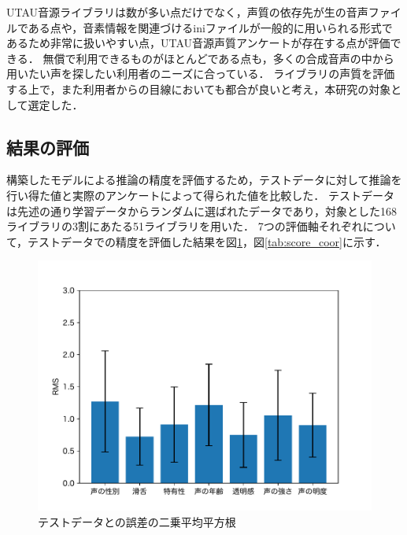 \documentclass[a4j,8pt,twocolumn]{extarticle}
\begin{document}
UTAU音源ライブラリは数が多い点だけでなく，声質の依存先が生の音声ファイルである点や，音素情報を関連づけるiniファイルが一般的に用いられる形式であるため非常に扱いやすい点，UTAU音源声質アンケートが存在する点が評価できる．
無償で利用できるものがほとんどである点も，多くの合成音声の中から用いたい声を探したい利用者のニーズに合っている．
ライブラリの声質を評価する上で，また利用者からの目線においても都合が良いと考え，本研究の対象として選定した．

\subsection{結果の評価} \label{sec:eval}
構築したモデルによる推論の精度を評価するため，テストデータに対して推論を行い得た値と実際のアンケートによって得られた値を比較した．
テストデータは先述の通り学習データからランダムに選ばれたデータであり，対象とした168ライブラリの3割にあたる51ライブラリを用いた．
7つの評価軸それぞれについて，テストデータでの精度を評価した結果を図\ref{tab:score_box}，図\ref{tab:score_coor}に示す．

\begin{figure}[h]
  \centering
  \includegraphics[width=\linewidth]{fig/model_quality_rms.pdf}
  \caption{テストデータとの誤差の二乗平均平方根}
  \label{tab:score_box}
\end{figure}
\end{document}
